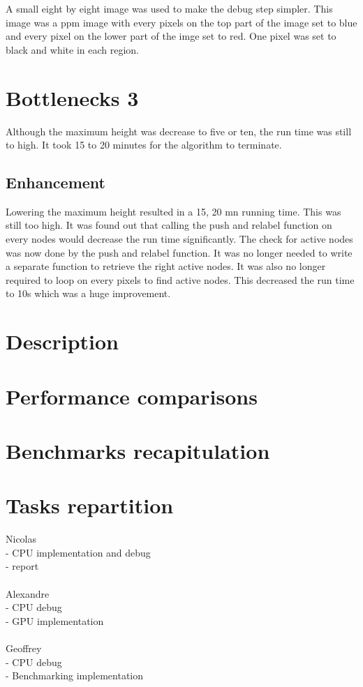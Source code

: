 \documentclass{article}
\begin{document}
A small eight by eight image was used to make the debug step simpler. This image was a ppm image with every pixels on the top part of the image set to blue and every pixel on the lower part of the imge set to red. One pixel was set to black and white in each region.

\section{Bottlenecks 3}

Although the maximum height was decrease to five or ten, the run time was still to high. It took 15 to 20 minutes for the algorithm to terminate.

\subsection{Enhancement}

Lowering the maximum height resulted in a 15, 20 mn running time. This was still too high. It was found out that calling the push and relabel function on every nodes would decrease the run time significantly. The check for active nodes was now done by the push and relabel function. It was no longer needed to write a separate function to retrieve the right active nodes. It was also no longer required to loop on every pixels to find active nodes. This decreased the run time to 10s which was a huge improvement.

\section{Description}

\section{Performance comparisons}

\section{Benchmarks recapitulation}

\section{Tasks repartition}

\noindent
Nicolas\\
- CPU implementation and debug\\
- report\\
\\
Alexandre\\
- CPU debug\\
- GPU implementation\\
\\
Geoffrey\\
- CPU debug\\
- Benchmarking implementation
\end{document}
